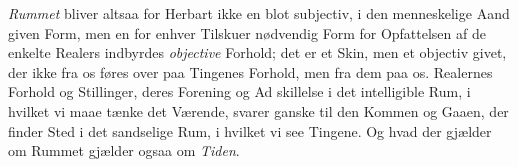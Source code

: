 \documentclass[12pt,a4paper]{book}
\begin{document}
\emph{Rummet} bliver altsaa for Herbart ikke en blot subjectiv,
i den menneskelige Aand given Form, men en for enhver Tilskuer
nødvendig Form for Opfattelsen af de enkelte Realers indbyrdes
\emph{objective} Forhold; det er et Skin, men et objectiv givet, der
ikke fra os føres over paa Tingenes Forhold, men fra dem paa
os. Realernes Forhold og Stillinger, deres Forening og Ad\-%
skillelse i det intelligible Rum, i hvilket vi maae tænke det
Værende, svarer ganske til den Kommen og Gaaen, der finder
Sted i det sandselige Rum, i hvilket vi see Tingene. Og hvad
der gjælder om Rummet gjælder ogsaa om \emph{Tiden}.
\end{document}
